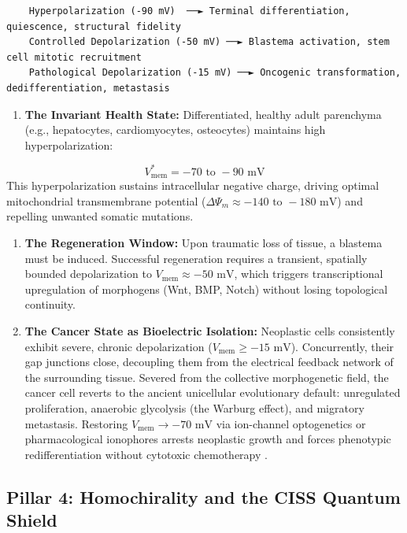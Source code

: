 \documentclass[10pt,twocolumn]{article}
\begin{document}
\begin{verbatim}
    Hyperpolarization (-90 mV)  ──► Terminal differentiation, quiescence, structural fidelity
    Controlled Depolarization (-50 mV) ──► Blastema activation, stem cell mitotic recruitment
    Pathological Depolarization (-15 mV) ──► Oncogenic transformation, dedifferentiation, metastasis
\end{verbatim}

\begin{enumerate}
  \item \textbf{The Invariant Health State:} Differentiated, healthy adult parenchyma (e.g., hepatocytes, cardiomyocytes, osteocytes) maintains high hyperpolarization:
\end{enumerate}
\begin{equation}
  V_{\text{mem}}^* = -70\text{ to }-90\text{ mV}
\end{equation}
   This hyperpolarization sustains intracellular negative charge, driving optimal mitochondrial transmembrane potential ($\Delta \Psi_m \approx -140\text{ to }-180\text{ mV}$) and repelling unwanted somatic mutations.
\begin{enumerate}
  \item \textbf{The Regeneration Window:} Upon traumatic loss of tissue, a blastema must be induced. Successful regeneration requires a transient, spatially bounded depolarization to $V_{\text{mem}} \approx -50\text{ mV}$, which triggers transcriptional upregulation of morphogens (Wnt, BMP, Notch) without losing topological continuity.
  \item \textbf{The Cancer State as Bioelectric Isolation:} Neoplastic cells consistently exhibit severe, chronic depolarization ($V_{\text{mem}} \ge -15\text{ mV}$). Concurrently, their gap junctions close, decoupling them from the electrical feedback network of the surrounding tissue. Severed from the collective morphogenetic field, the cancer cell reverts to the ancient unicellular evolutionary default: unregulated proliferation, anaerobic glycolysis (the Warburg effect), and migratory metastasis. Restoring $V_{\text{mem}} \to -70\text{ mV}$ via ion-channel optogenetics or pharmacological ionophores arrests neoplastic growth and forces phenotypic redifferentiation without cytotoxic chemotherapy \cite{Chernet2013, Levin2021}.
\end{enumerate}


\subsection{Pillar 4: Homochirality and the CISS Quantum Shield}
\end{document}
